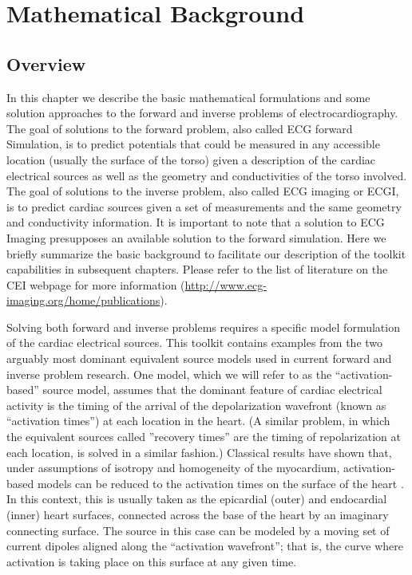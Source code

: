 \chapter{Mathematical Background} \label{sec:math}

\section{Overview}

In this chapter we describe the basic mathematical formulations and some
solution approaches to the forward and inverse problems of
electrocardiography. The goal of solutions to the forward problem, also called ECG
forward Simulation, is to
predict potentials that could be measured in any accessible location
(usually the surface of the torso) given a description of the cardiac
electrical sources as well as the geometry and conductivities of the torso involved.
The goal of solutions to the inverse problem, also called ECG imaging or ECGI,
is to predict cardiac sources given a set
of measurements and the same geometry and conductivity information. It is
important to note that a solution to ECG Imaging presupposes an
available solution to the forward simulation.
Here we briefly summarize the basic background to
facilitate our description of the toolkit capabilities in subsequent chapters.
Please refer to the list of literature on the CEI webpage
for more information (\url{http://www.ecg-imaging.org/home/publications}).


Solving both forward and inverse problems requires a specific model formulation of
the cardiac electrical sources. This toolkit contains examples from the two arguably
most dominant equivalent source models used in current forward and inverse
problem research. One model, which we will refer to as the ``activation-based''
source model, assumes that the dominant feature of cardiac electrical activity
is the timing of the arrival of the depolarization wavefront (known as ``activation times'')
at each location in the heart. (A similar problem, in which the equivalent
sources called ''recovery times'' are the timing of repolarization at each
location, is solved in a similar fashion.) Classical results have shown that,
under assumptions of isotropy and homogeneity of
the myocardium, activation-based models can be reduced to the activation
times on the surface of the heart \cite{RSM:Oos2004}. In this context, this is usually taken as
the epicardial (outer) and endocardial (inner) heart surfaces, connected
across the base of the heart by an imaginary connecting surface. The source
in this case can be modeled by a moving set of current dipoles aligned
along the ``activation wavefront''; that is, the curve where activation is
taking place on this surface at any given time.


